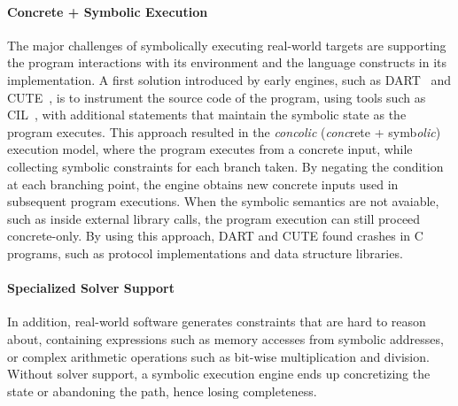 \paragraph{Concrete + Symbolic Execution}

The major challenges of symbolically executing real-world targets are supporting the program interactions with its environment and the language constructs in its implementation.
%
A first solution introduced by early engines, such as DART~\cite{dart} and CUTE~\cite{cute}, is to instrument the source code of the program, using tools such as CIL~\cite{cil}, with additional statements that maintain the symbolic state as the program executes.  This approach resulted in the \emph{concolic} (\emph{conc}rete + symb\emph{olic}) execution model, where the program executes from a concrete input, while collecting symbolic constraints for each branch taken.  By negating the condition at each branching point, the engine obtains new concrete inputs used in subsequent program executions.
%
When the symbolic semantics are not avaiable, such as inside external library calls, the program execution can still proceed concrete-only.
%
By using this approach, DART and CUTE found crashes in C programs, such as protocol implementations and data structure libraries.


\paragraph{Specialized Solver Support}

In addition, real-world software generates constraints that are hard to reason about, containing expressions such as memory accesses from symbolic addresses, or complex arithmetic operations such as bit-wise multiplication and division.  Without solver support, a symbolic execution engine ends up concretizing the state or abandoning the path, hence losing completeness.

